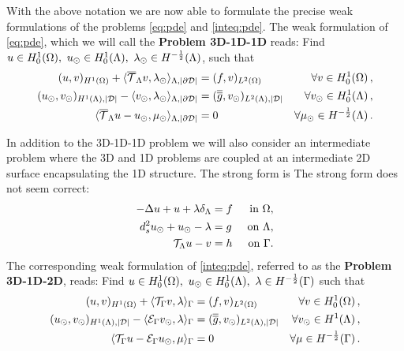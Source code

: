 \documentclass[r]{siamart171218}
\newcommand{\miro}[1]{{\color{cyan}#1}}
\begin{document}
With the above notation we are now able to formulate the precise weak formulations of the problems \eqref{eq:pde} and \eqref{inteq:pde}. The weak formulation of \eqref{eq:pde}, which we will call the \textbf{Problem 3D-1D-1D} reads:  Find $u \in H^1_0(\Omega),\ u_{\odot} \in H^1_0(\Lambda), \ \lambda_{\odot} \in H^{-\frac 1 2}(\Lambda)$, such that
\begin{subequations}\label{eq:problem2}
\begin{align}
(u,v)_{H^1(\Omega)} 
+  \langle {\overline{\mathcal{T}}_\Lambda} v, \lambda_{\odot} \rangle_{\Lambda, |\partial\mathcal{D}|} &= 
(f,v)_{L^2(\Omega)} &\forall v \in H^1_0(\Omega)\, ,\\
(u_{\odot},v_{\odot})_{H^1(\Lambda),|\mathcal{D}|} - \langle  v_{\odot}, \lambda_{\odot} \rangle_{\Lambda, |\partial\mathcal{D}|} 
&=  (\overline{\overline{g}},v_{\odot})_{L^2(\Lambda),|\mathcal{D}|}
&\forall v_{\odot} \in H^1_0(\Lambda)\, ,\\
\langle {\overline{\mathcal{T}}_\Lambda} u -   u_{\odot}, \mu_{\odot} \rangle_{\Lambda,|\partial\mathcal{D}|} &= 0
&\forall \mu_{\odot} \in H^{-\frac 1 2}(\Lambda)\,.
\end{align}
\end{subequations}

In addition to the 3D-1D-1D problem we will also consider an 
intermediate problem where the 3D and 1D problems are coupled at an
intermediate 2D surface  encapsulating the 1D structure. The strong form is \miro{The strong form does not seem correct}:  
\begin{subequations}
\label{inteq:pde}
\begin{align}
\label{inteq:pde1}
  -\Delta u + u + \lambda \delta_{\Lambda} &= f &\mbox{ in } \Omega,\\ 
\label{inteq:pde2}
 d_s^2 \ud + \ud - \lambda &= g &\mbox{ on } \Lambda,\\
\label{inteq:coupling}
\mathcal{T}_\Lambda u - v  &=  h &\mbox{ on } \Gamma . 
\end{align}
\end{subequations}
The corresponding weak formulation of \eqref{inteq:pde}, referred to as the \textbf{Problem 3D-1D-2D}, reads: 
Find $u \in H^1_0(\Omega), \ \ud \in H^1_0(\Lambda), \ \lambda \in H^{-\frac 1 2}(\Gamma ) $ such that
\begin{subequations}\label{eq:problem1}
\begin{align}
(u,v)_{H^1(\Omega)} + \langle {\mathcal{T}_\Gamma} v, \lambda \rangle_\Gamma &= (f,v)_{L^2(\Omega)} &\forall v \in H^1_0(\Omega)\, ,
\\
 (u_{\odot},v_{\odot})_{H^1(\Lambda),|\mathcal{D}|}  -  \langle \mathcal{E}_\Gamma v_{\odot}, \lambda \rangle_\Gamma
&=  (\overline{\overline{g}},v_{\odot})_{L^2(\Lambda),|\mathcal{D}|} &\forall v_{\odot} \in H^1(\Lambda)\, ,\\
\langle {\mathcal{T}_\Gamma} u - \mathcal{E}_\Gamma u_{\odot} , \mu \rangle_\Gamma &= 0 &\forall \mu \in H^{-\frac 1 2}(\Gamma)\,.
\end{align}
\end{subequations}
\end{document}
